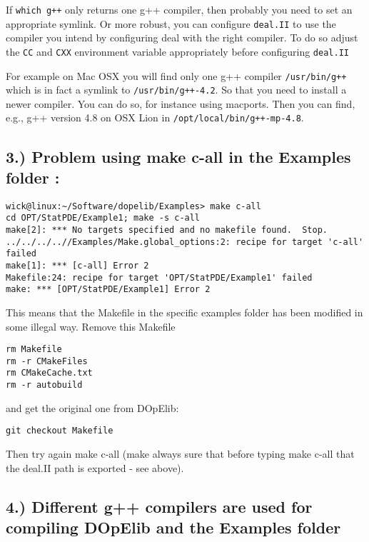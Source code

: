   If \texttt{which g++} only returns one g++ compiler, then probably you need to
  set an appropriate symlink. Or more robust, you can configure \texttt{deal.II}
  to use the compiler you intend by configuring deal with the right compiler. To
  do so adjust  the \texttt{CC} and \texttt{CXX} environment variable appropriately
  before configuring \texttt{deal.II}
  
  For example on Mac OSX you will find only one g++ compiler \texttt{/usr/bin/g++}
  which is in fact a symlink to \texttt{/usr/bin/g++-4.2}. 
  So that you need to install a newer compiler. You can do so, for instance
  using macports. Then you can find, e.g., g++ version 4.8 on OSX Lion 
  in \texttt{/opt/local/bin/g++-mp-4.8}. 


\subsection*{3.) Problem using make c-all in the Examples folder :}

\begin{lstlisting}
wick@linux:~/Software/dopelib/Examples> make c-all
cd OPT/StatPDE/Example1; make -s c-all
make[2]: *** No targets specified and no makefile found.  Stop.
../../../..//Examples/Make.global_options:2: recipe for target 'c-all' failed
make[1]: *** [c-all] Error 2
Makefile:24: recipe for target 'OPT/StatPDE/Example1' failed
make: *** [OPT/StatPDE/Example1] Error 2
\end{lstlisting}

This means that the Makefile in the specific examples folder has been 
modified in some illegal way. Remove this Makefile 
\begin{lstlisting}
rm Makefile
rm -r CMakeFiles
rm CMakeCache.txt
rm -r autobuild
\end{lstlisting}
and get the original 
one from DOpElib:
\begin{lstlisting}
git checkout Makefile
\end{lstlisting}
Then try again make c-all (make always sure that before 
typing make c-all that the deal.II path is exported - see above).
\newline
\subsection*{4.) Different g++ compilers are used for compiling DOpElib and the
Examples folder}

